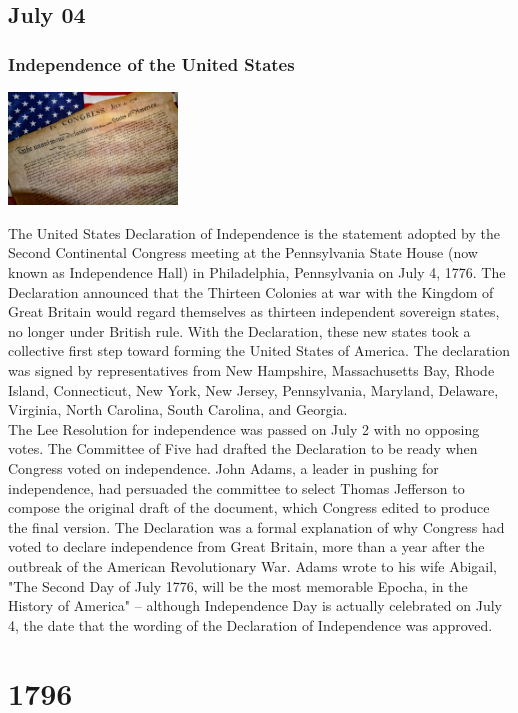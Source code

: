 \documentclass[11pt]{report}
\begin{document}
\section{July 04}
\subsection{Independence of the United States}
\vspace{2mm}\begin{center}\includegraphics[width=4.5cm]{./img/usaIndep.jpg}\end{center}
The United States Declaration of Independence is the statement adopted by the Second Continental Congress meeting at the Pennsylvania State House (now known as Independence Hall) in Philadelphia, Pennsylvania on July 4, 1776. The Declaration announced that the Thirteen Colonies at war with the Kingdom of Great Britain would regard themselves as thirteen independent sovereign states, no longer under British rule. With the Declaration, these new states took a collective first step toward forming the United States of America. The declaration was signed by representatives from New Hampshire, Massachusetts Bay, Rhode Island, Connecticut, New York, New Jersey, Pennsylvania, Maryland, Delaware, Virginia, North Carolina, South Carolina, and Georgia.\\
The Lee Resolution for independence was passed on July 2 with no opposing votes. The Committee of Five had drafted the Declaration to be ready when Congress voted on independence. John Adams, a leader in pushing for independence, had persuaded the committee to select Thomas Jefferson to compose the original draft of the document, which Congress edited to produce the final version. The Declaration was a formal explanation of why Congress had voted to declare independence from Great Britain, more than a year after the outbreak of the American Revolutionary War. Adams wrote to his wife Abigail, "The Second Day of July 1776, will be the most memorable Epocha, in the History of America" – although Independence Day is actually celebrated on July 4, the date that the wording of the Declaration of Independence was approved.
\chapter{1796}
\end{document}
